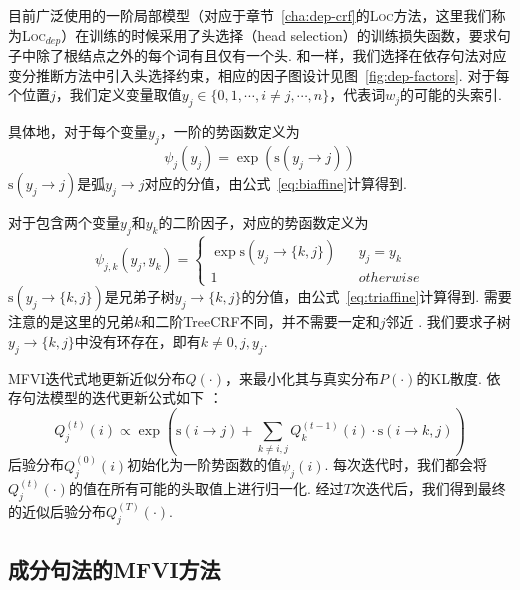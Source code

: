 目前广泛使用的一阶局部模型（对应于章节~\ref{cha:dep-crf}的\textsc{Loc}方法，这里我们称为\textsc{Loc}$_{dep}$）在训练的时候采用了头选择（head selection）的训练损失函数，要求句子中除了根结点之外的每个词有且仅有一个头.
和\citet{wang-tu-2020-second}一样，我们选择在依存句法对应变分推断方法中引入头选择约束，相应的因子图设计见图~\ref{fig:dep-factors}.
对于每个位置$j$，我们定义变量取值$y_j\in \{0,1,\cdots,i\neq j,\cdots,n\}$，代表词$w_j$的可能的头索引.

具体地，对于每个变量$y_j$，一阶的势函数定义为
\begin{equation}
  \label{eq:dep-1o-potential}
  \psi_j(y_j)=\exp(\mathrm{s}(y_j\rightarrow j))
\end{equation}
$\mathrm{s}(y_j\rightarrow j)$是弧$y_j\rightarrow j$对应的分值，由公式~\ref{eq:biaffine}计算得到.

对于包含两个变量$y_{j}$和$y_{k}$的二阶因子，对应的势函数定义为
\begin{equation}
  \label{eq:2o-dep-potential}
  \psi_{j,k}(y_j,y_k)=\left\{
  \begin{array}{rcl}
    \exp \mathrm{s}(y_j\rightarrow \{k,j\}) &  & {y_j=y_k}   \\
    1                                       &  & {otherwise}
  \end{array}
  \right.
\end{equation}
$\mathrm{s}(y_j\rightarrow \{k,j\})$是兄弟子树$y_j\rightarrow \{k,j\}$的分值，由公式~\ref{eq:triaffine}计算得到.
需要注意的是这里的兄弟$k$和二阶TreeCRF不同，并不需要一定和$j$邻近 \citep{smith-eisner-2008-dependency}.
我们要求子树$y_j\rightarrow \{k,j\}$中没有环存在，即有$k\neq {0,j,y_j}$.

MFVI迭代式地更新近似分布$Q(\cdot)$，来最小化其与真实分布$P(\cdot)$的KL散度.
依存句法模型的迭代更新公式如下 \citep{wang-tu-2020-second}：
\begin{equation}
  \label{eq:mfvi-dep}
  Q_{j}^{(t)}(i)\propto \exp\left(\mathrm{s}(i\rightarrow j) +\sum_{k\neq i,j} Q_{k}^{(t-1)}(i)\cdot \mathrm{s}(i\rightarrow {k,j}) \right)
\end{equation}
后验分布$Q_j^{(0)}(i)$初始化为一阶势函数的值$\psi_j(i)$.
每次迭代时，我们都会将$Q_j^{(t)}(\cdot)$的值在所有可能的头取值上进行归一化.
经过$T$次迭代后，我们得到最终的近似后验分布$Q_j^{(T)}(\cdot)$.

\subsection{成分句法的MFVI方法}\label{sec:con-vi}

